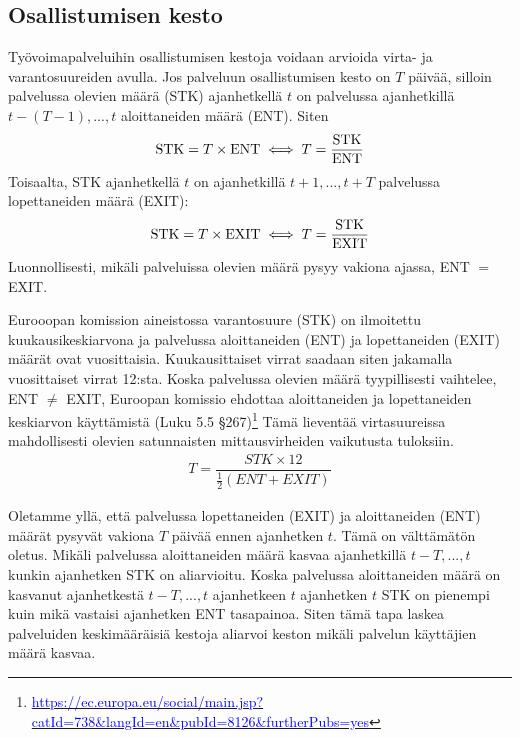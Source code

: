 \documentclass[12pt]{article}
\begin{document}
\subsection{Osallistumisen kesto}

Työvoimapalveluihin osallistumisen kestoja voidaan arvioida virta- ja varantosuureiden avulla. Jos palveluun osallistumisen kesto on $T$ päivää, silloin palvelussa olevien määrä (STK) ajanhetkellä $t$ on palvelussa ajanhetkillä $t - (T-1), ..., t$ aloittaneiden määrä (ENT). Siten 
\begin{align}
 \textup{STK} = T \times \textup{ENT} \iff T = \dfrac{\textup{STK}}{\textup{ENT}}
\end{align}
Toisaalta, STK ajanhetkellä $t$ on ajanhetkillä $t+1, ..., t + T$ palvelussa lopettaneiden määrä (EXIT):   
\begin{align}
 \textup{STK} = T \times \textup{EXIT} \iff T = \dfrac{\textup{STK}}{\textup{EXIT}}
\end{align}
Luonnollisesti, mikäli palveluissa olevien määrä pysyy vakiona ajassa, ENT $=$ EXIT. 

Eurooopan komission aineistossa varantosuure (STK) on ilmoitettu kuukausikeskiarvona ja palvelussa aloittaneiden (ENT) ja lopettaneiden (EXIT) määrät ovat vuosittaisia. Kuukausittaiset virrat saadaan siten jakamalla vuosittaiset virrat 12:sta. Koska palvelussa olevien määrä tyypillisesti vaihtelee, ENT $\neq$ EXIT, Euroopan komissio ehdottaa aloittaneiden ja lopettaneiden keskiarvon käyttämistä (Luku 5.5 \S 267)\footnote{\href{https://ec.europa.eu/social/main.jsp?catId=738&langId=en&pubId=8126&furtherPubs=yes}{\textcolor{blue}{https://ec.europa.eu/social/main.jsp?catId=738\&langId=en\&pubId=8126\&furtherPubs=yes}}} Tämä lieventää virtasuureissa mahdollisesti olevien satunnaisten mittausvirheiden vaikutusta tuloksiin.
\begin{align}
 T = \dfrac{STK \times 12}{\frac{1}{2} (ENT + EXIT)}
\end{align} 

Oletamme yllä, että palvelussa lopettaneiden (EXIT) ja aloittaneiden (ENT) määrät pysyvät vakiona $T$ päivää ennen ajanhetken $t$. Tämä on välttämätön oletus. Mikäli palvelussa aloittaneiden määrä kasvaa ajanhetkillä $t- T, ..., t$ kunkin ajanhetken STK on aliarvioitu. Koska palvelussa aloittaneiden määrä on kasvanut ajanhetkestä $t - T, ..., t$ ajanhetkeen $t$ ajanhetken $t$ STK on pienempi kuin mikä vastaisi ajanhetken ENT tasapainoa. Siten tämä tapa laskea palveluiden keskimääräisiä kestoja aliarvoi keston mikäli palvelun käyttäjien määrä kasvaa. 
\end{document}
